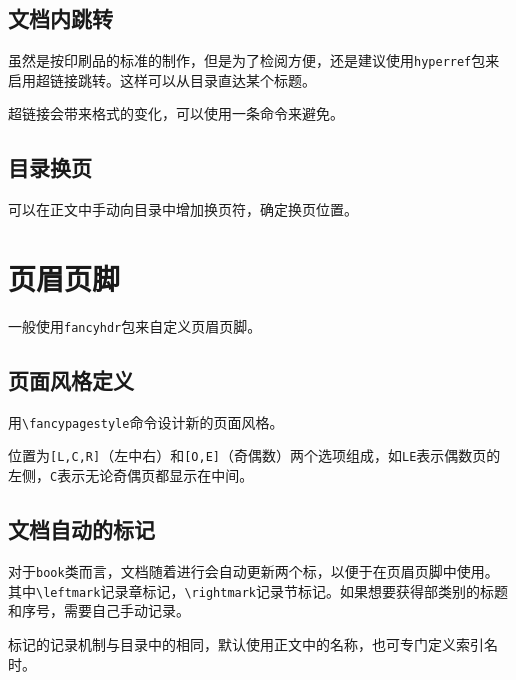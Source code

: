 \documentclass[10pt,openany]{book}
\begin{document}
\begin{sloppypar}
    \section{文档内跳转}

    虽然是按印刷品的标准的制作，但是为了检阅方便，还是建议使用\texttt{hyperref}包来启用超链接跳转。这样可以从目录直达某个标题。

    超链接会带来格式的变化，可以使用一条命令来避免。

    

    \section{目录换页}

    可以在正文中手动向目录中增加换页符，确定换页位置。

    

    \chapter{页眉页脚}
    \label{hf}

    一般使用\texttt{fancyhdr}包来自定义页眉页脚。

    \section{页面风格定义}

    用\texttt{\textbackslash{}fancypagestyle}命令设计新的页面风格。

    

    位置为\texttt{{[}L,C,R{]}}（左中右）和\texttt{{[}O,E{]}}（奇偶数）两个选项组成，如\texttt{LE}表示偶数页的左侧，\texttt{C}表示无论奇偶页都显示在中间。

    \section{文档自动的标记}

    对于\texttt{book}类而言，文档随着进行会自动更新两个标，以便于在页眉页脚中使用。其中\texttt{\textbackslash{}leftmark}记录章标记，\texttt{\textbackslash{}rightmark}记录节标记。如果想要获得部类别的标题和序号，需要自己手动记录。

    标记的记录机制与目录中的相同，默认使用正文中的名称，也可专门定义索引名时。


\end{sloppypar}
\end{document}
